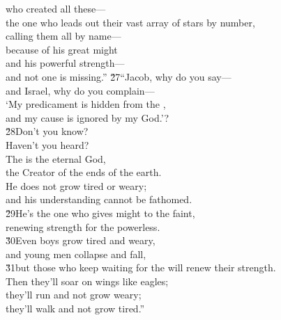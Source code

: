 \begin{poetry}
\poemll    who created all these--- \\
\poeml the one who leads out their vast array of stars by number, \\
\poemll    calling them all by name--- \\
\poeml because of his great might \\
\poemll    and his powerful strength--- \\
\poemlll       and not one is missing.''
\poeml \v{27}``Jacob, why do you say--- \\
\poemll    and Israel, why do you complain--- \\
\poeml `My predicament is hidden from the , \\
\poemll    and my cause is ignored by my God.'? \\
\poeml \v{28}Don't you know? \\
\poemll    Haven't you heard? \\
\poeml The  is the eternal God, \\
\poemlll       the Creator of the ends of the earth. \\
\poeml He does not grow tired or weary; \\
\poemll    and his understanding cannot be fathomed. \\
\poeml \v{29}He's the one who gives might to the faint, \\
\poemll    renewing strength for the powerless. \\
\poeml \v{30}Even boys grow tired and weary, \\
\poemll    and young men collapse and fall, \\
\poeml \v{31}but those who keep waiting for the  will renew their strength. \\
\poemll    Then they'll soar on wings like eagles; \\
\poeml they'll run and not grow weary; \\
\poemll    they'll walk and not grow tired.''
\end{poetry}

